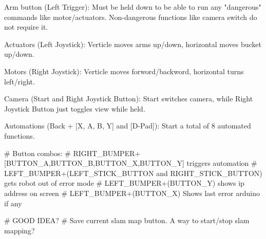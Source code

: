 Arm button (Left Trigger): Must be held down to be able to run any "dangerous" commands like motor/actuators. 
Non-dangerous functions like camera switch do not require it.

Actuators (Left Joystick): Verticle moves arms up/down, horizontal moves bucket up/down.

Motors (Right Joystick): Verticle moves forword/backword, horizontal turns left/right. 

Camera (Start and Right Joystick Button): Start switches camera, while Right Joystick Button just toggles view while held.

Automations (Back + [X, A, B, Y] and [D-Pad]): Start a total of 8 automated functions.







# Button combos: 
# RIGHT_BUMPER+[BUTTON_A,BUTTON_B,BUTTON_X,BUTTON_Y] triggers automation
# LEFT_BUMPER+(LEFT_STICK_BUTTON and RIGHT_STICK_BUTTON) gets robot out of error mode
# LEFT_BUMPER+(BUTTON_Y) shows ip address on screen
# LEFT_BUMPER+(BUTTON_X) Shows last error arduino if any

# GOOD IDEA?
# Save current slam map button. A way to start/stop slam mapping?